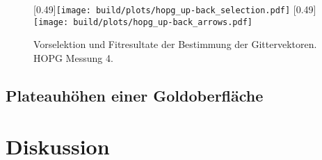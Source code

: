 \begin{figure}
    \centering
    [0.49\linewidth]{\texttt{[image: build/plots/hopg\_up-back\_selection.pdf]}}
    [0.49\linewidth]{\texttt{[image: build/plots/hopg\_up-back\_arrows.pdf]}}
    \caption{Vorselektion und Fitresultate der Bestimmung der Gittervektoren. HOPG Messung \num{4}.}
    \label{fig:hopg4_fit}
\end{figure}
\clearpage

\subsection{Plateauhöhen einer Goldoberfläche}
\label{subsec:gold}

\clearpage
\section{Diskussion}
\label{sec:diskussion}
